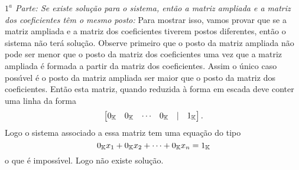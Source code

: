 \begin{prova}
	\textit{$1^a$ Parte: Se existe solu\c{c}\~ao para o sistema, ent\~ao a matriz ampliada e a matriz dos coeficientes t\^em o mesmo posto:} Para mostrar isso, vamos provar que se a matriz ampliada e a matriz dos coeficientes tiverem postos diferentes, ent\~ao o sistema n\~ao ter\'a solu\c{c}\~ao. Observe primeiro que o posto da matriz ampliada n\~ao pode ser menor que o posto da matriz dos coeficientes uma vez que a matriz ampliada \'e formada a partir da matriz dos coeficientes. Assim o \'unico caso poss{\'\i}vel \'e o posto da matriz ampliada ser maior que o posto da matriz dos coeficientes. Ent\~ao esta matriz, quando reduzida \`a forma em escada deve conter uma linha da forma
	\[
		\begin{bmatrix}
			0_{\mathbb{K}} & 0_{\mathbb{K}} & \cdots & 0_{\mathbb{K}} & \mid & 1_{\mathbb{K}}
		\end{bmatrix}.
	\]
	Logo o sistema associado a essa matriz tem uma equa\c{c}\~ao do tipo
	\[
		0_{\mathbb{K}}x_1 + 0_{\mathbb{K}}x_2 + \cdots + 0_{\mathbb{K}}x_n = 1_{\mathbb{K}}
	\]
	o que \'e imposs{\'\i}vel. Logo n\~ao existe solu\c{c}\~ao.


\end{prova}
